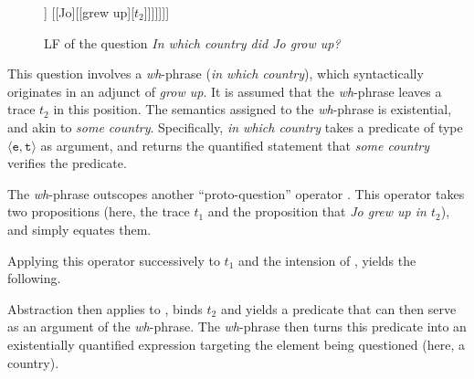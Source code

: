 \begin{figure}[H]
	\centering
	\begin{forest}
		[\fbox{5}[$\lambda_1$][\fbox{4}[{(In which country)$_2$}] [\fbox{3}[$\lambda_2$] [\fbox{2}[[?][$t_1$]] [{}[Jo][[grew up][$t_2$]]]]]]]
	\end{forest}
	\caption{LF of the question \textit{In which country did Jo grow up?}}\label{fig1:question-lf}
\end{figure}

This question involves a \textit{wh}-phrase (\textit{in which country}), which syntactically originates in an adjunct of \textit{grow up}. It is assumed that the \textit{wh}-phrase leaves a trace $t_2$ in this position. The semantics assigned to the \textit{wh}-phrase is existential, and akin to \textit{some country}. Specifically, \textit{in which country} takes a predicate of type $\langle \texttt{e}, \texttt{t} \rangle$ as argument, and returns the quantified statement that \textit{some country} verifies the predicate.

\begin{exe}
\end{exe}

The \textit{wh}-phrase outscopes another ``proto-question'' operator \citep{Karttunen1977}. This operator takes two propositions (here, the trace $t_1$ and the proposition that \textit{Jo grew up in $t_2$}), and simply equates them. 

\begin{exe}
\end{exe}

Applying this operator successively to $t_1$ and the intension of , yields the following.

\begin{exe}
\end{exe}

Abstraction then applies to , binds $t_2$ and yields a predicate that can then serve as an argument of the \textit{wh}-phrase. The \textit{wh}-phrase then turns this predicate into an existentially quantified expression targeting the element being questioned (here, a country).

